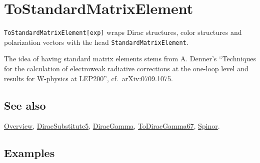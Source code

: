 \documentclass[../FeynCalcManual.tex]{subfiles}
\begin{document}
\hypertarget{tostandardmatrixelement}{%
\section{ToStandardMatrixElement}\label{tostandardmatrixelement}}

\texttt{ToStandardMatrixElement[\allowbreak{}exp]} wraps Dirac
structures, color structures and polarization vectors with the head
\texttt{StandardMatrixElement}.

The idea of having standard matrix elements stems from A. Denner's
``Techniques for the calculation of electroweak radiative corrections at
the one-loop level and results for W-physics at LEP200'',
cf.~\href{https://arxiv.org/abs/0709.1075}{arXiv:0709.1075}.

\subsection{See also}

\hyperlink{toc}{Overview},
\hyperlink{diracsubstitute5}{DiracSubstitute5},
\hyperlink{diracgamma}{DiracGamma},
\hyperlink{todiracgamma67}{ToDiracGamma67}, \hyperlink{spinor}{Spinor}.

\subsection{Examples}

\begin{Shaded}
\begin{Highlighting}[]
\OperatorTok{[}\OperatorTok{[}\OperatorTok{,} \OperatorTok{],} \OperatorTok{,} \OperatorTok{]}\OperatorTok{[}\SpecialCharTok{\textbackslash{}}\OperatorTok{[}\OperatorTok{]]}\OperatorTok{[}\SpecialCharTok{{-}}\OperatorTok{[}\OperatorTok{,} \OperatorTok{],} \OperatorTok{,} \OperatorTok{]}\SpecialCharTok{*}
\OperatorTok{[}\SpecialCharTok{{-}}\OperatorTok{[}\OperatorTok{,} \OperatorTok{],}\OperatorTok{[}\OperatorTok{],} \OperatorTok{]}\OperatorTok{[}\SpecialCharTok{\textbackslash{}}\OperatorTok{[}\OperatorTok{]]}\OperatorTok{[}\OperatorTok{[}\OperatorTok{,} \OperatorTok{],}\OperatorTok{[}\OperatorTok{],} \OperatorTok{]} 
 
\OperatorTok{[}\SpecialCharTok{\%}\OperatorTok{]}
\end{Highlighting}
\end{Shaded}
\end{document}
